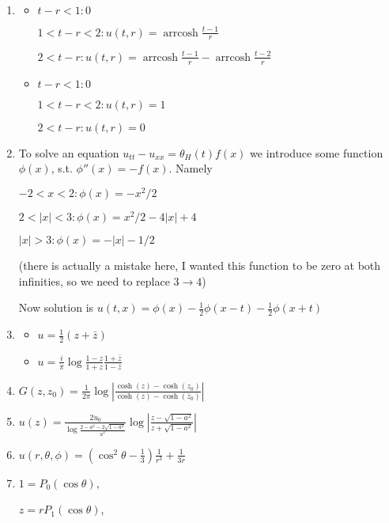 \documentclass[a4paper,11pt]{article}
\begin{document}
\begin{enumerate}
\item\label{item:50} 

\begin{itemize}
\item \(t-r<1: 0\)

\(1<t-r<2: u(t,r)=\operatorname{arrcosh}\frac{t-1}{r}\)

 \(2<t-r: u(t,r)=\operatorname{arrcosh}\frac{t-1}{r}-\operatorname{arrcosh}\frac{t-2}{r}\)
\item \(t-r<1: 0\)

\(1<t-r<2: u(t,r)=1\)

 \(2<t-r: u(t,r)=0\)
\end{itemize}

\item\label{item:51} To solve an equation \(u_{tt}-u_{xx}=\theta_H(t)f(x)\) we introduce some function \(\phi(x)\), s.t. \(\phi''(x)=-f(x)\). Namely

\(-2<x<2: \phi(x)=-x^2/2\)

\(2<|x|<3: \phi(x)=x^2/2-4|x|+4\)

\(|x|>3: \phi(x)=-|x|-1/2\)

(there is actually a mistake here, I wanted this function to be zero at both infinities, so we need to replace \(3\to 4\))

Now solution is \(u(t,x)=\phi(x)-\frac12 \phi(x-t)-\frac12 \phi(x+t)\)

\item\label{item:52} 

\begin{itemize}
\item \(u=\frac12(z+\bar{z})\)
\item \(u=\frac{i}{\pi}\log \frac{1-z}{1+z}\frac{1+\bar{z}}{1-\bar{z}}\)
\end{itemize}

\item\label{item:53} \(G(z,z_0)=\frac1{2\pi}\log|\frac{\cosh(z)-\cosh(z_0)}{\cosh(z)-\cosh(\bar{z}_0)}|\)

\item\label{item:54} \(u(z)=\frac{2u_0}{\log \frac{2-a^2-2 \sqrt{1-a^2}}{a^2}}\log |\frac{z-\sqrt{1-a^2}}{z+\sqrt{1-a^2}}|\)

\item\label{item:55} \(u(r,\theta,\phi)=(\cos^2\theta-\frac1{3})\frac1{r^3}+\frac1{3r}\)

\item\label{item:62}
\(1=P_0(\cos\theta)\),

\(z=r P_1(\cos\theta)\),


\end{enumerate}
\end{document}
